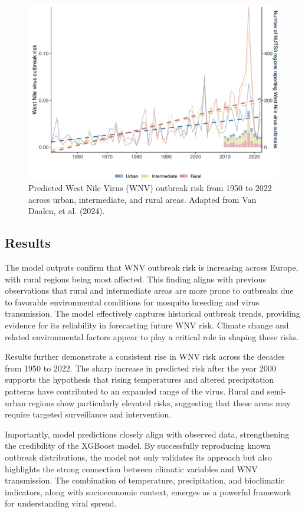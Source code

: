 \documentclass[
]{krantz}
\begin{document}
\begin{figure}
\includegraphics[width=1\linewidth]{3} \caption{Predicted West Nile Virus (WNV) outbreak risk from 1950 to 2022 across urban, intermediate, and rural areas. Adapted from Van Daalen, et al. (2024).}\label{fig:wnvrisktrend}
\end{figure}

\subsection{Results}\label{results-4}

The model outputs confirm that WNV outbreak risk is increasing across Europe, with rural regions being most affected. This finding aligns with previous observations that rural and intermediate areas are more prone to outbreaks due to favorable environmental conditions for mosquito breeding and virus transmission. The model effectively captures historical outbreak trends, providing evidence for its reliability in forecasting future WNV risk. Climate change and related environmental factors appear to play a critical role in shaping these risks.

Results further demonstrate a consistent rise in WNV risk across the decades from 1950 to 2022. The sharp increase in predicted risk after the year 2000 supports the hypothesis that rising temperatures and altered precipitation patterns have contributed to an expanded range of the virus. Rural and semi-urban regions show particularly elevated risks, suggesting that these areas may require targeted surveillance and intervention.

Importantly, model predictions closely align with observed data, strengthening the credibility of the XGBoost model. By successfully reproducing known outbreak distributions, the model not only validates its approach but also highlights the strong connection between climatic variables and WNV transmission. The combination of temperature, precipitation, and bioclimatic indicators, along with socioeconomic context, emerges as a powerful framework for understanding viral spread.
\end{document}
